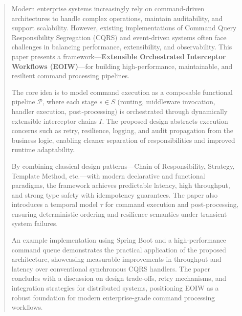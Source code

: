 \sloppy
\begin{abstract}
	Modern enterprise systems increasingly rely on command-driven architectures to handle complex operations, maintain auditability, and support scalability. However, existing implementations of Command Query Responsibility Segregation (CQRS) and event-driven systems often face challenges in balancing performance, extensibility, and observability. This paper presents a framework—\textbf{Extensible Orchestrated Interceptor Workflows (EOIW)}—for building high-performance, maintainable, and resilient command processing pipelines. 

	The core idea is to model command execution as a composable functional pipeline $\mathcal{P}$, where each stage $s \in S$ (routing, middleware invocation, handler execution, post-processing) is orchestrated through dynamically extensible interceptor chains $I$. The proposed design abstracts execution concerns such as retry, resilience, logging, and audit propagation from the business logic, enabling cleaner separation of responsibilities and improved runtime adaptability.

	By combining classical design patterns—Chain of Responsibility, Strategy, Template Method, etc.—with modern declarative and functional paradigms, the framework achieves predictable latency, high throughput, and strong type safety with idempotency guarantees. The paper also introduces a temporal model $\tau$ for command execution and post-processing, ensuring deterministic ordering and resilience semantics under transient system failures.

	An example implementation using Spring Boot and a high-performance command queue demonstrates the practical application of the proposed architecture, showcasing measurable improvements in throughput and latency over conventional synchronous CQRS handlers. The paper concludes with a discussion on design trade-offs, retry mechanisms, and integration strategies for distributed systems, positioning EOIW as a robust foundation for modern enterprise-grade command processing workflows.
\end{abstract}